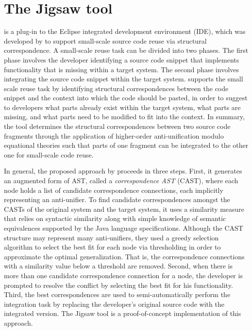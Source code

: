 \section{The Jigsaw tool}\label{Jigsaw}

 is a plug-in to the Eclipse integrated development environment (IDE), which was developed by \citet{2008:fse:cottrell} to support small-scale source code reuse via structural correspondence. A small-scale reuse task can be divided into two phases. The first phase involves the developer identifying a source code snippet that implements functionality that is missing within a target system. The second phase involves integrating the source code snippet within the target system.
 supports the small scale reuse task by identifying structural correspondences between the code snippet and the context into which the code should be pasted, in order to suggest to developers what parts already exist within the target system, what parts are missing, and what parts need to be modified to fit into the context. In summary, the  tool determines the structural correspondences between two  source code fragments through the application of higher-order anti-unification modulo equational theories such that parts of one fragment can be integrated to the other one for small-scale code reuse.


In general, the proposed approach by \citeauthor{2008:fse:cottrell} proceeds in three steps. First, it generates an augmented form of AST, called a \emph{correspondence AST} (CAST), where each node holds a list of candidate correspondence connections, each implicitly representing an anti-unifier. To find candidate correspondences amongst the CASTs of the original system and the target system, it uses a similarity measure that relies on syntactic similarity along with simple knowledge of semantic equivalences supported by the Java language specifications. Although the CAST structure may represent many anti-unifiers, they used a greedy selection algorithm to select the best fit for each node via thresholding in order to approximate the optimal generalization. That is, the correspondence connections with a similarity value below a threshold are removed. Second, when there is more than one candidate correspondence connection for a node, the developer is prompted to resolve the conflict by selecting the best fit for his functionality. Third, the best correspondences are used to semi-automatically perform the integration task by replacing the developer’s original source code with the integrated version. The Jigsaw tool is a proof-of-concept implementation of this approach.


